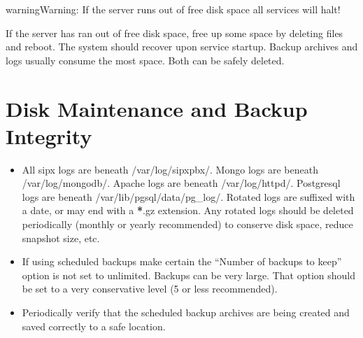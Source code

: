 \documentclass[letterpaper,10pt,english]{sphinxmanual}
\begin{document}
\begin{sphinxadmonition}{warning}{Warning:}
If the server runs out of free disk space all services will halt!
\end{sphinxadmonition}

If the server has ran out of free disk space, free up some space by deleting files and reboot. The system should recover upon service startup.
Backup archives and logs usually consume the most space. Both can be safely deleted.


\section{Disk Maintenance and Backup Integrity}
\label{\detokenize{maintenance:disk-maintenance-and-backup-integrity}}\begin{itemize}
\item {} 
All sipx logs are beneath /var/log/sipxpbx/. Mongo logs are beneath /var/log/mongodb/.
Apache logs are beneath /var/log/httpd/. Postgresql logs are beneath /var/lib/pgsql/data/pg\_log/.
Rotated logs are suffixed with a date, or may end with a {\color{red}\bfseries{}*}.gz extension.
Any rotated logs should be deleted periodically (monthly or yearly recommended) to conserve disk space, reduce snapshot size, etc.

\item {} 
If using scheduled backups make certain the “Number of backups to keep” option is not set to unlimited. Backups can be very large. That option should be set to a very conservative level (5 or less recommended).

\item {} 
Periodically verify that the scheduled backup archives are being created and saved correctly to a safe location.

\end{itemize}
\end{document}
